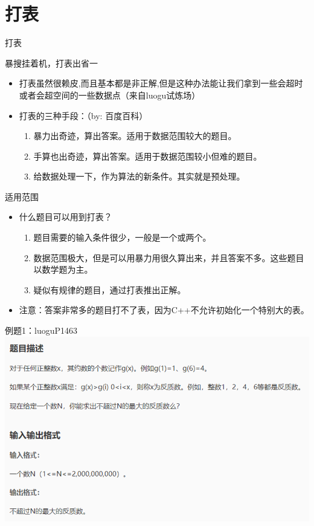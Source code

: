 \documentclass{beamer}[UTF-8]
\begin{document}
\section{打表} %
\begin{frame}{打表}
 \pause
\begin{center} 暴搜挂着机，打表出省一 \end{center}
 \pause
\begin{itemize}
\item 打表虽然很赖皮,而且基本都是非正解,但是这种办法能让我们拿到一些会超时或者会超空间的一些数据点（来自luogu试炼场） \pause
\item 打表的三种手段：（by: 百度百科） \pause
\begin{enumerate}
\item 暴力出奇迹，算出答案。适用于数据范围较大的题目。 \pause
\item 手算也出奇迹，算出答案。适用于数据范围较小但难的题目。 \pause
\item 给数据处理一下，作为算法的新条件。其实就是预处理。
\end{enumerate}
\end{itemize}

\end{frame}

\begin{frame}{适用范围}
 \pause
\begin{itemize}
\item 什么题目可以用到打表？ \pause
\begin{enumerate}
\item 题目需要的输入条件很少，一般是一个或两个。 \pause
\item 数据范围极大，但是可以用暴力用很久算出来，并且答案不多。这些题目以数学题为主。 \pause
\item 疑似有规律的题目，通过打表推出正解。 \pause
\end{enumerate}
\item 注意：答案非常多的题目打不了表，因为C++不允许初始化一个特别大的表。
\end{itemize}
\end{frame}

\begin{frame}{例题1：luoguP1463}
\includegraphics[width=\textwidth, height=\textheight]{luoguP1463.png}
\end{frame}
\end{document}

